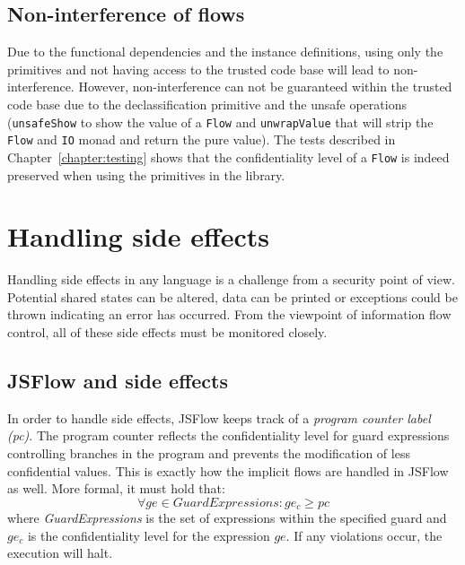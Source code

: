 \subsection{Non-interference of flows}
Due to the functional dependencies and the instance definitions, using only the primitives and not having access to the trusted code base will lead to non-interference. However, non-interference can not be guaranteed within the trusted code base due to the declassification primitive and the unsafe operations ({\tt unsafeShow} to show the value of a {\tt Flow} and {\tt unwrapValue} that will strip the {\tt Flow} and {\tt IO} monad and return the pure value). The tests described in Chapter~\ref{chapter:testing} shows that the confidentiality level of a {\tt Flow} is indeed preserved when using the primitives in the library.

\section{Handling side effects}
Handling side effects in any language is a challenge from a security point of view. Potential shared states can be altered, data can be printed or exceptions could be thrown indicating an error has occurred. From the viewpoint of information flow control, all of these side effects must be monitored closely.

\subsection{JSFlow and side effects}
In order to handle side effects, JSFlow keeps track of a \emph{program counter label (pc)}. The program counter reflects the confidentiality level for guard expressions controlling branches in the program and prevents the modification of less confidential values. This is exactly how the implicit flows are handled in JSFlow as well. More formal, it must hold that:
\[
\forall ge \in GuardExpressions: ge_c \geq pc
\]
where \emph{GuardExpressions} is the set of expressions within the specified guard and \(ge_c\) is the confidentiality level for the expression \(ge\). If any violations occur, the execution will halt.

